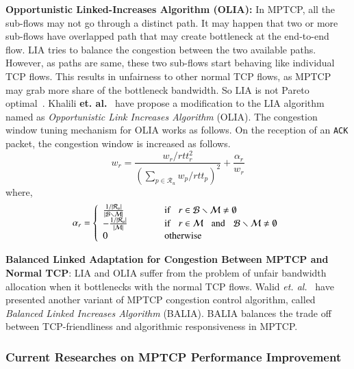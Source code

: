 \textbf{Opportunistic Linked-Increases Algorithm (OLIA):} In MPTCP, all the sub-flows may not go through a distinct path. It may happen that two or more sub-flows have overlapped path that may create bottleneck at the end-to-end flow. LIA tries to balance the congestion between the two available paths. However, as paths are same, these two sub-flows start behaving like individual TCP flows. This results in unfairness to other normal TCP flows, as MPTCP may grab more share of the bottleneck bandwidth. So LIA is not Pareto optimal~\cite{OLIARamin2012}. Khalili \textbf{et. al.}~\cite{OLIARamin2012} have propose a modification to the LIA algorithm named as \textit{Opportunistic Link Increases Algorithm} (OLIA). The congestion window tuning mechanism for OLIA works as follows.  On the reception of an \texttt{ACK} packet, the congestion window is increased as follows. 
\begin{equation}
w_r = \frac{w_r/rtt_r^2}{\left( \sum_{p \in \mathcal{R}_u}w_p/rtt_p\right)^2} + \frac{\alpha_r}{w_r}
\end{equation}
where,
\begin{equation}
\alpha_r = \left\lbrace 
\begin{array}{ll}
\frac{1/|\mathcal{R}_u|}{|\mathcal{B}\smallsetminus \mathcal{M}|}  &\mbox{if} \hspace{0.3cm} r \in \mathcal{B}\smallsetminus\mathcal{M}\neq\emptyset   \\
- \frac{1/|\mathcal{R}_u|}{|\mathcal{M}|} \hspace{1cm}&\mbox{if} \hspace{0.3cm} r \in \mathcal{M} \hspace{0.3cm}\mbox{and}\hspace{0.3cm}\mathcal{B}\smallsetminus\mathcal{M}\neq \emptyset \\
0 & \mbox{otherwise}
\end{array} \right. 
\end{equation}


\textbf{Balanced Linked Adaptation for Congestion Between MPTCP and Normal TCP}:
LIA and OLIA  suffer from the problem of unfair bandwidth allocation when it bottlenecks with the normal TCP flows. Walid \textit{et. al.}~\cite{walid2015balanced} have presented another variant of MPTCP congestion control algorithm, called {\em Balanced Linked Increases Algorithm} (BALIA). BALIA balances the trade off between TCP-friendliness and algorithmic responsiveness in MPTCP.

\subsubsection{Current Researches on MPTCP Performance Improvement}

